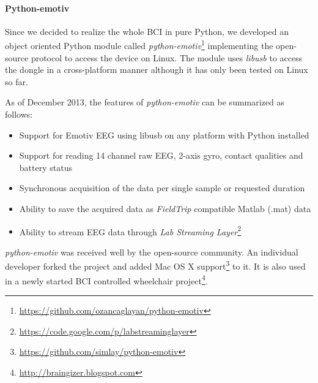 \documentclass[12pt]{article}
\newcommand\mysubsubsubsection[1]{\paragraph{#1}\hspace{0pt}}
\numberwithin{equation}{section}
\numberwithin{figure}{section}
\numberwithin{table}{section}
\begin{document}
\newpage
\mysubsubsubsection{Python-emotiv}
\par{
    Since we decided to realize the whole BCI in pure Python, we developed an object oriented
    Python module called \emph{python-emotiv}\footnote{\url{https://github.com/ozancaglayan/python-emotiv}}
    implementing the open-source protocol to access the device on Linux. The module uses \emph{libusb}
    to access the dongle in a cross-platform manner although it has only been tested on Linux
    so far.
}
\par{
    As of December 2013, the features of \emph{python-emotiv} can be summarized as follows:
    \begin{itemize}
        \item Support for Emotiv EEG using libusb on any platform with Python installed
        \item Support for reading 14 channel raw EEG, 2-axis gyro, contact qualities and battery status
        \item Synchronous acquisition of the data per single sample or requested duration
        \item Ability to save the acquired data as \emph{FieldTrip} \citep{oostenveld_fieldtrip:_2011} compatible Matlab (.mat) data
        \item Ability to stream EEG data through \emph{Lab Streaming Layer}\footnote{\url{https://code.google.com/p/labstreaminglayer}}
    \end{itemize}
}
\par{
    \emph{python-emotiv} was received well by the open-source community. An individual developer
    forked the project and added Mac OS X support\footnote{\url{https://github.com/simlay/python-emotiv}} to it.
    It is also used in a newly started BCI controlled wheelchair project\footnote{\url{http://braingizer.blogspot.com}}.
}
\end{document}

